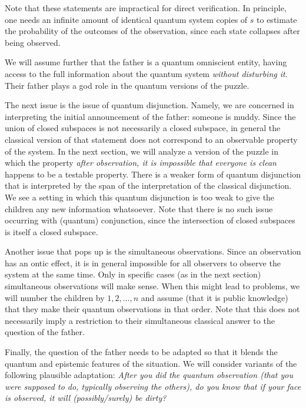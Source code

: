 \documentclass[a4paper]{article}
\begin{document}
Note that these statements are impractical for direct verification. In
principle, one needs an infinite amount of identical quantum system copies of
$s$ to estimate the probability of the outcomes of the observation, since each
state collapses after being observed.

We will assume further that the father is a quantum omniscient entity, having
access to the full information about the quantum system \emph{without disturbing
it}. Their father plays a god role in the quantum versions of the puzzle.

The next issue is the issue of quantum disjunction. Namely, we are concerned in
interpreting the initial announcement of the father: someone is muddy. Since the
union of closed subspaces is not necessarily a closed subspace, in general the
classical version of that statement does not correspond to an observable
property of the system. In the next section, we will analyze a version of the
puzzle in which the property \emph{after observation, it is impossible that
everyone is clean} happens to be a testable property. There is a weaker form of
quantum disjunction that is interpreted by the span of the interpretation of the
classical disjunction. We see a setting in which this quantum disjunction is too
weak to give the children any new information whatsoever. Note that there is no
such issue occurring with (quantum) conjunction, since the intersection of
closed subspaces is itself a closed subspace.

Another issue that pops up is the simultaneous observations. Since an
observation has an ontic effect, it is in general impossible for all observers
to observe the system at the same time. Only in specific cases (as in the next
section) simultaneous observations will make sense. When this might lead to
problems, we will number the children by $1, 2, \dots, n$ and assume (that it is
public knowledge) that they make their quantum observations in that order. Note
that this does not necessarily imply a restriction to their simultaneous
classical answer to the question of the father.

Finally, the question of the father needs to be adapted so that it blends the
quantum and epistemic features of the situation. We will consider variants of 
the following plausible adaptation:
\emph{After you did the quantum observation (that you were supposed to do,
    typically observing the others), do you know that if your face is observed,
it will (possibly/surely) be dirty?}
\end{document}
